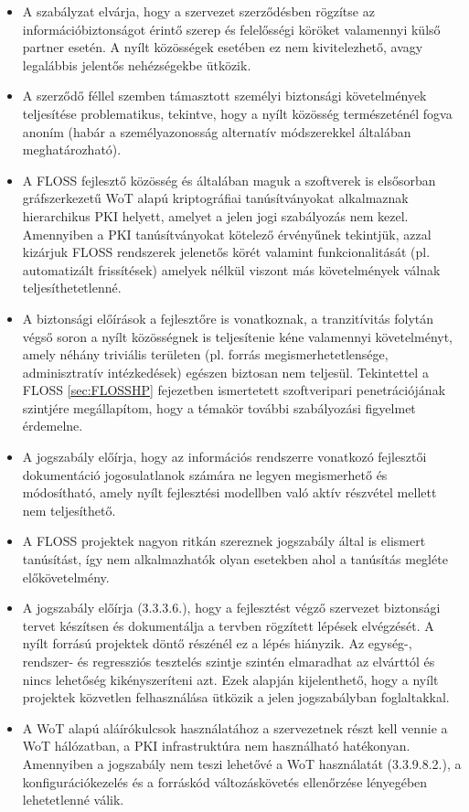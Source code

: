 \documentclass[12pt,magyar,a4paper,oneside]{scrreprt}
\begin{document}
\begin{itemize}
\item
  A szabályzat elvárja, hogy a szervezet szerződésben rögzítse az
  információbiztonságot érintő szerep és felelősségi köröket valamennyi
  külső partner esetén. A nyílt közösségek esetében ez nem
  kivitelezhető, avagy legalábbis jelentős nehézségekbe ütközik.
\item
  A szerződő féllel szemben támasztott személyi biztonsági követelmények
  teljesítése problematikus, tekintve, hogy a nyílt közösség
  természeténél fogva anoním (habár a személyazonosság alternatív
  módszerekkel általában meghatározható).
\item
  A FLOSS fejlesztő közösség és általában maguk a szoftverek is
  elsősorban gráfszerkezetű WoT alapú kriptográfiai tanúsítványokat
  alkalmaznak hierarchikus PKI helyett, amelyet a jelen jogi szabályozás
  nem kezel. Amennyiben a PKI tanúsítványokat kötelező érvényűnek
  tekintjük, azzal kizárjuk FLOSS rendszerek jelenetős körét valamint
  funkcionalitását (pl. automatizált frissítések) amelyek nélkül viszont
  más követelmények válnak teljesíthetetlenné.
\item
  A biztonsági előírások a fejlesztőre is vonatkoznak, a tranzitívitás
  folytán végső soron a nyílt közösségnek is teljesítenie kéne
  valamennyi követelményt, amely néhány triviális területen (pl. forrás
  megismerhetetlensége, adminisztratív intézkedések) egészen biztosan
  nem teljesül. Tekintettel a FLOSS \ref{sec:FLOSSHP} fejezetben
  ismertetett szoftveripari penetrációjának szintjére megállapítom, hogy
  a témakör további szabályozási figyelmet érdemelne.
\item
  A jogszabály előírja, hogy az információs rendszerre vonatkozó
  fejlesztői dokumentáció jogosulatlanok számára ne legyen megismerhető
  és módosítható, amely nyílt fejlesztési modellben való aktív részvétel
  mellett nem teljesíthető.
\item
  A FLOSS projektek nagyon ritkán szereznek jogszabály által is elismert
  tanúsítást, így nem alkalmazhatók olyan esetekben ahol a tanúsítás
  megléte előkövetelmény.
\item
  A jogszabály előírja (3.3.3.6.), hogy a fejlesztést végző szervezet
  biztonsági tervet készítsen és dokumentálja a tervben rögzített
  lépések elvégzését. A nyílt forrású projektek döntő részénél ez a
  lépés hiányzik. Az egység-, rendszer- és regressziós tesztelés szintje
  szintén elmaradhat az elvárttól és nincs lehetőség kikényszeríteni
  azt. Ezek alapján kijelenthető, hogy a nyílt projektek közvetlen
  felhasználása ütközik a jelen jogszabályban foglaltakkal.
\item
  A WoT alapú aláírókulcsok használatához a szervezetnek részt kell
  vennie a WoT hálózatban, a PKI infrastruktúra nem használható
  hatékonyan. Amennyiben a jogszabály nem teszi lehetővé a WoT
  használatát (3.3.9.8.2.), a konfigurációkezelés és a forráskód
  változáskövetés ellenőrzése lényegében lehetetlenné válik.
\end{itemize}
\end{document}
